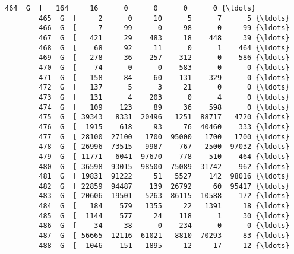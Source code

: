 \documentclass[11pt]{article}
\begin{document}
\begin{Verbatim}[commandchars=\\\{\}]
        464  G  [   164     16      0      0      0      0 {\ldots}   
        465  G  [     2      0     10      5      7      5 {\ldots}   
        466  G  [     7     99      0     98      0     99 {\ldots}   
        467  G  [   421     29    483     18    448     39 {\ldots}   
        468  G  [    68     92     11      0      1    464 {\ldots}   
        469  G  [   278     36    257    312      0    586 {\ldots}   
        470  G  [    74      0      0    583      0      0 {\ldots}   
        471  G  [   158     84     60    131    329      0 {\ldots}   
        472  G  [   137      5      3     21      0      0 {\ldots}   
        473  G  [   131      4    203      0      4      0 {\ldots}   
        474  G  [   109    123     89     36    598      0 {\ldots}   
        475  G  [ 39343   8331  20496   1251  88717   4720 {\ldots}   
        476  G  [  1915    618     93     76  40460    333 {\ldots}   
        477  G  [ 28100  27100   1700  95000   1700   1700 {\ldots}   
        478  G  [ 26996  73515   9987    767   2500  97032 {\ldots}   
        479  G  [ 11771   6041  97670    778    510    464 {\ldots}   
        480  G  [ 36598  93015  98500  75089  31742    962 {\ldots}   
        481  G  [ 19831  91222     51   5527    142  98016 {\ldots}   
        482  G  [ 22859  94487    139  26792     60  95417 {\ldots}   
        483  G  [ 20606  19501   5263  86115  10588    172 {\ldots}   
        484  G  [   184    579   1355     22   1391     18 {\ldots}   
        485  G  [  1144    577     24    118      1     30 {\ldots}   
        486  G  [    34     38      0    234      0      0 {\ldots}   
        487  G  [ 56665  12116  61021   8810  70293     83 {\ldots}   
        488  G  [  1046    151   1895     12     17     12 {\ldots}   
        

\end{Verbatim}
\end{document}
